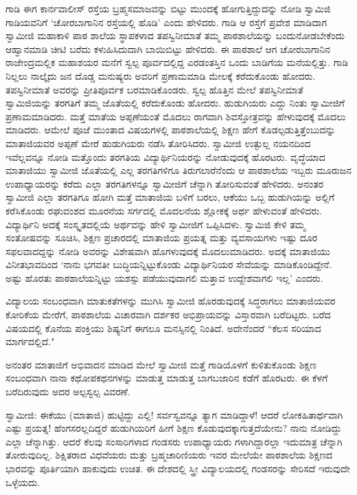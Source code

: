 ಗಾಡಿ ಈಗ ಕಾರ್ನವಾಲೀಸ್ ರಸ್ತೆಯ ಬ್ರಹ್ಮಸಮಾಜವನ್ನು ಬಿಟ್ಟು ಮುಂದಕ್ಕೆ ಹೋಗುತ್ತಿದ್ದುದನ್ನು ನೋಡಿ ಸ್ವಾಮಿಜಿ ಗಾಡಿಯವನಿಗೆ ‘ಚೋರಬಾಗಾನಿನ ರಸ್ತೆಯಲ್ಲಿ ಹೊಡಿ’ ಎಂದು ಹೇಳಿದರು. ಗಾಡಿ ಆ ರಸ್ತೆಗೆ ಪ್ರವೇಶ ಮಾಡಿದಾಗ ಸ್ವಾಮೀಜಿ ಮಹಾಕಾಳಿ ಪಾಠ ಶಾಲೆಯ ಸ್ಥಾಪಕಳಾದ ತಪಸ್ವಿನೀಮಾತೆ ತಮ್ಮ ಪಾಠಶಾಲೆಯನ್ನು ಬಂದುನೋಡಬೇಕೆಂದು ಆಹ್ವಾನಮಾಡಿ ಚೀಟಿ ಬರೆದು ಕಳುಹಿಸಿದುದಾಗಿ ಬಾಯಿಬಿಟ್ಟು ಹೇಳಿದರು. ಈ ಪಾಠಶಾಲೆ ಆಗ ಚೋರಬಾಗಾನಿನ ರಾಜೇಂದ್ರಮಲ್ಲಿಕ ಮಹಾಶಯರ ಮನೆಗೆ ಸ್ವಲ್ಪ ಪೂರ್ವದಲ್ಲಿದ್ದ ಎರಡಂತಸ್ತಿನ ಒಂದು ಬಾಡಿಗೆಯ ಮನೆಯಲ್ಲಿತ್ತು. ಗಾಡಿ ನಿಲ್ಲಲು ನಾಲ್ಕೈದು ಜನ ದೊಡ್ಡ ಮನುಷ್ಯರು ಅವರಿಗೆ ಪ್ರಣಾಮಮಾಡಿ ಮೇಲಕ್ಕೆ ಕರೆದುಕೊಂಡು ಹೋದರು. ತಪಸ್ವಿನೀಮಾತೆ ಅವರನ್ನು ಪ್ರೀತಿಪೂರ್ವಕ ಬರಮಾಡಿಕೊಂಡರು. ಸ್ವಲ್ಪ ಹೊತ್ತಿನ ಮೇಲೆ ತಪಸ್ವಿನೀಮಾತೆ ಸ್ವಾಮಿಜಿಯನ್ನು ತರಗತಿಗೆ ತಮ್ಮ ಜೊತೆಯಲ್ಲಿ ಕರೆದುಕೊಂಡು ಹೋದರು. ಹುಡುಗಿಯರು ಎದ್ದು ನಿಂತು ಸ್ವಾಮೀಜಿಗೆ ಪ್ರಣಾಮಮಾಡಿದರು. ಮತ್ತೆ ಮಾತೆಯ ಅಪ್ಪಣೆಯಂತೆ ಮೊದಲು ರಾಗವಾಗಿ ಶಿವಸ್ತೋತ್ರವನ್ನು ಹೇಳುವುದಕ್ಕೆ ಮೊದಲು ಮಾಡಿದರು. ಆಮೇಲೆ ಪೂಜೆ ಮುಂತಾದ ವಿಷಯಗಳಲ್ಲಿ ಪಾಠಶಾಲೆಯಲ್ಲಿ ಶಿಕ್ಷಣ ಹೇಗೆ ಕೊಡಲ್ಪಡುತ್ತಿತ್ತೆಂಬುದನ್ನು ಮಾತಾಜಿಯವರ ಅಪ್ಪಣೆ ಮೇರೆ ಹುಡುಗಿಯರು ನಡೆಸಿ ತೋರಿಸಿದರು. ಸ್ವಾಮೀಜಿ ಉತ್ಫುಲ್ಲ ನಯನದಿಂದ ಇವೆಲ್ಲವನ್ನೂ ನೋಡಿ ಮತ್ತೊಂದು ತರಗತಿಯ ವಿದ್ಯಾರ್ಥಿನಿಯರನ್ನು ನೋಡುವುದಕ್ಕೆ ಹೊರಟರು. ವೃದ್ಧೆಯಾದ ಮಾತಾಜಿಯು ಸ್ವಾಮೀಜಿ ಜೊತೆಯಲ್ಲಿ ಎಲ್ಲ ತರಗತಿಗಳಿಗೂ ತಿರುಗಲಾರೆನೆಂದು ಆ ಪಾಠಶಾಲೆಯ ಇಬ್ಬರು ಮೂರುಜನ ಉಪಾಧ್ಯಾಯರನ್ನು ಕರೆದು ಎಲ್ಲಾ ತರಗತಿಗಳನ್ನೂ ಸ್ವಾಮೀಜಿಗೆ ಚೆನ್ನಾಗಿ ತೋರಿಸುವಂತೆ ಹೇಳಿದರು. ಅನಂತರ ಸ್ವಾಮೀಜಿ ಎಲ್ಲಾ ತರಗತಿಗೂ ಹೋಗಿ ಮತ್ತೆ ಮಾತಾಜಿಯ ಬಳಿಗೆ ಬರಲು, ಆಕೆಯು ಒಬ್ಬ ಹುಡುಗಿಯನ್ನು ಅಲ್ಲಿಗೆ ಕರೆಸಿಕೊಂಡು ರಘುವಂಶದ ಮೂರನೆಯ ಸರ್ಗದಲ್ಲಿ ಮೊದಲನೆಯ ಶ್ಲೋಕಕ್ಕೆ ಅರ್ಥ ಹೇಳುವಂತೆ ಹೇಳಿದರು. ವಿದ್ಯಾರ್ಥಿನಿ ಅದಕ್ಕೆ ಸಂಸ್ಕೃತದಲ್ಲಿಯೆ ಅರ್ಥವನ್ನು ಹೇಳಿ ಸ್ವಾಮೀಜಿಗೆ ಒಪ್ಪಿಸಿದಳು. ಸ್ವಾಮಿಜಿ ಕೇಳಿ ತಮ್ಮ ಸಂತೋಷವನ್ನು ಸೂಚಿಸಿ, ಶಿಕ್ಷಣ ಪ್ರಚಾರದಲ್ಲಿ ಮಾತಾಜಿಯ ಪ್ರಯತ್ನ ಮತ್ತು ವ್ಯವಸಾಯಗಳು ಇಷ್ಟು ದೂರ ಸಫಲವಾದದ್ದನ್ನು ನೋಡಿ ಅವರನ್ನು ವಿಶೇಷವಾಗಿ ಹೊಗಳುವುದಕ್ಕೆ ಮೊದಲುಮಾಡಿದರು. ಅದಕ್ಕೆ ಮಾತಾಜಿಯು ವಿನೀತಭಾವದಿಂದ ‘ನಾನು ಭಗವತೀ ಬುದ್ಧಿಯನ್ನಿಟ್ಟುಕೊಂಡು ವಿದ್ಯಾರ್ಥಿನಿಯರ ಸೇವೆಯನ್ನು ಮಾಡಿಕೊಂಡಿದ್ದೇನೆ. ಅಷ್ಟು ಹೊರತು ಪಾಠಶಾಲೆಯನ್ನಿಟ್ಟು ಯಶಸ್ಸು ಪಡೆಯುವುದಾಗಲಿ ಮತ್ತಾವ ಉದ್ದೇಶವಾಗಲಿ ಇಲ್ಲ’ ಎಂದರು.

ವಿದ್ಯಾಲಯ ಸಂಬಂಧವಾಗಿ ಮಾತುಕತೆಗಳನ್ನು ಮುಗಿಸಿ ಸ್ವಾಮೀಜಿ ಹೊರಡುವುದಕ್ಕೆ ಸಿದ್ಧರಾಗಲು ಮಾತಾಜಿಯವರ ಕೋರಿಕೆಯ ಮೇರೆಗೆ, ಪಾಠಶಾಲೆಯ ವಿಚಾರವಾಗಿ ದರ್ಶಕರ ಅಭಿಪ್ರಾಯವನ್ನು ವಿಸ್ತಾರವಾಗಿ ಬರೆದಿಟ್ಟರು. ಬರೆದ ವಿಷಯದಲ್ಲಿ ಕೊನೆಯ ಪಂಕ್ತಿಯು ಶಿಷ್ಯನಿಗೆ ಈಗಲೂ ಮನಸ್ಸಿನಲ್ಲಿ ನಿಂತಿದೆ. ಅದೇನೆಂದರೆ “ಕೆಲಸ ಸರಿಯಾದ ಮಾರ್ಗದಲ್ಲಿದೆ."

ಅನಂತರ ಮಾತಾಜಿಗೆ ಅಭಿವಾದನ ಮಾಡಿದ ಮೇಲೆ ಸ್ವಾಮೀಜಿ ಮತ್ತೆ ಗಾಡಿಯೊಳಗೆ ಕುಳಿತುಕೊಂಡು ಶಿಕ್ಷಣ ಸಂಬಂಧವಾಗಿ ನಾನಾ ಕಥೋಪಕಥನಗಳನ್ನು ಮಾಡುತ್ತ ಮಾಡುತ್ತ ಬಾಗಬಜಾರಿನ ಕಡೆಗೆ ಹೊರಟರು. ಈ ಕೆಳಗೆ ಬರೆದಿರುವುದು ಅದರ ಅಲ್ಪಸ್ವಲ್ಪ ವಿವರಣೆ.

ಸ್ವಾಮೀಜಿ: ಈಕೆಯು (ಮಾತಾಜಿ) ಹುಟ್ಟಿದ್ದು ಎಲ್ಲಿ! ಸರ್ವಸ್ವವನ್ನೂ ತ್ಯಾಗ ಮಾಡಿದ್ದಾಳೆ! ಆದರೆ ಲೋಕಹಿತಾರ್ಥವಾಗಿ ಎಷ್ಟು ಪ್ರಯತ್ನ! ಹೆಂಗಸರಲ್ಲದಿದ್ದರೆ ಹುಡುಗಿಯರಿಗೆ ಹೀಗೆ ಶಿಕ್ಷಣ ಕೊಡುವುದಕ್ಕಾಗುತ್ತದೆಯೇನು? ನಾನು ನೋಡಿದ್ದು ಎಲ್ಲಾ ಚೆನ್ನಾಗಿತ್ತು. ಆದರೆ ಕೆಲವು ಸಂಸಾರಿಗಳಾದ ಗಂಡಸರು ಉಪಾಧ್ಯಾಯರು ಗಳಾಗಿದ್ದಾರಲ್ಲಾ ಇದುಮಾತ್ರ ಚೆನ್ನಾಗಿ ತೋರುವುದಿಲ್ಲ. ಶಿಕ್ಷಿತರಾದ ವಿಧವೆಯರು ಮತ್ತು ಬ್ರಹ್ಮಚಾರಿಣಿಯರು ಇವರ ಮೇಲೆಯೇ ಪಾಠಶಾಲೆಯ ಶಿಕ್ಷಣದ ಭಾರವನ್ನು ಪೂರ್ತಿಯಾಗಿ ಹಾಕುವುದು ಉಚಿತ. ಈ ದೇಶದಲ್ಲಿ ಸ್ತ್ರೀ ವಿದ್ಯಾಲಯದಲ್ಲಿ ಗಂಡಸರನ್ನು ಸೇರಿಸದೆ ಇರುವುದೇ ಒಳ್ಳೆಯದು.

